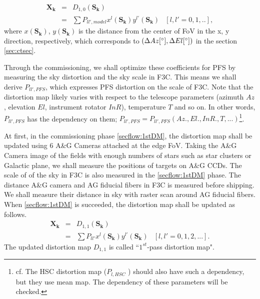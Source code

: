 \begin{equation}
\begin{array}{cclc}
\bm{X_k} & = & D_{1,0} (\bm{S_k}) \\
& = & \sum P_{ll',model} x^l (\bm{S_k})y^{l'} (\bm{S_k}) & [l, l'=0,1,..],
\end{array}
\end{equation}
where $x(\bm{S_k})$, $y(\bm{S_k})$ is the distance from the center of FoV in the x, y direction, respectively, which corresponds to $(\Delta Az [ ^\circ ], \Delta El [ ^\circ ])$ in the section \ref{sec:ctsec}.

Through the commissioning, we shall optimize these coefficients for PFS by measuring the sky distortion and the sky scale in F3C.
This means we shall derive $P_{ll',PFS}$, which expresses PFS distortion on the scale of F3C.
Note that the distortion map likely varies with respect to the telescope parameters (azimuth $Az$, elevation $El$, instrument rotator $InR$), temperature $T$ and so on.
In other words, $P_{ll',PFS}$ has the dependency on them; $P_{ll',PFS}=P_{ll',PFS}(Az., El., InR., T, ...)$\footnote{cf. The HSC distortion map ($P_{l,HSC}$ ) should also have such a dependency, but they use mean map. The dependency of these parameters will be checked.}.

\bigskip

At first, in the commissioning phase \ref{secflow:1stDM}, the distortion map shall be updated using 6 A\&G Cameras attached at the edge FoV. 
Taking the A\&G Camera image of the fields with enough numbers of stars such as star clusters or Galactic plane, we shall measure the positions of targets on A\&G CCDs.
The scale of of the sky in F3C is also measured in the \ref{secflow:1stDM} phase.
The distance A\&G camera and AG fiducial fibers in F3C is measured before shipping.
We shall measure their distance in sky with raster scan around AG fiducial fibers.
When \ref{secflow:1stDM} is succeeded, the distortion map shall be updated as follows.
\begin{equation}
\begin{array}{cclc}
\bm{X_k} & = & D_{1,1} (\bm{S_k}) \\
& = & \sum P_{ll'} x^l (\bm{S_k})y^{l'} (\bm{S_k}) & [l, l'=0,1,2, ...].
\end{array}
\end{equation}
The updated distortion map $D_{1,1}$ is called ``$1^{st}$-pass distortion map".


